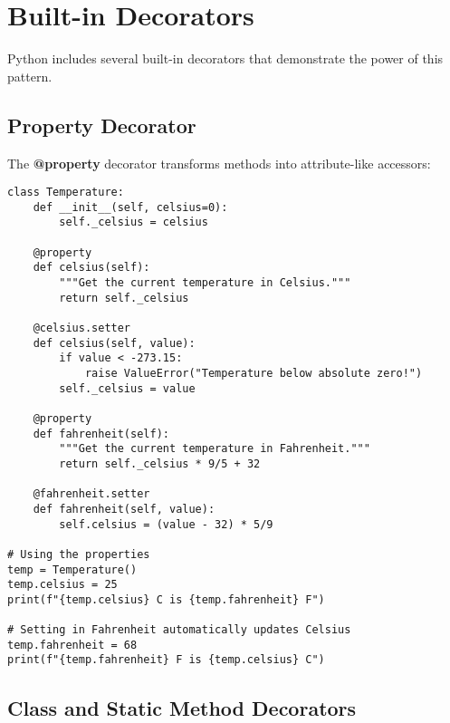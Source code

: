 \documentclass[12pt,letterpaper]{article}
\newenvironment{macterminal}{%
    \begin{mdframed}[
        linecolor=terminalFrame,
        backgroundcolor=terminalBg,
        roundcorner=5pt,
        skipabove=10pt,
        skipbelow=10pt,
        linewidth=1pt,
        innertopmargin=10pt, %
        frametitle={%
            \tikz[baseline=(current bounding box.east), outer sep=0pt]{
                \fill[red!80!black] (0,0) circle (5pt);
                \fill[yellow!80!black] (0.7,0) circle (5pt);
                \fill[green!70!black] (1.4,0) circle (5pt);
            }
        },
        frametitlealignment=\raggedright, %
        frametitleaboveskip=8pt, %
        frametitlebelowskip=0pt, %
    ]
}{%
    \end{mdframed}%
}
\begin{document}
\section{Built-in Decorators}

Python includes several built-in decorators that demonstrate the power of this pattern.

\subsection{Property Decorator}

The \textbf{\textcolor{accentColor}{@property}} decorator transforms methods into attribute-like accessors:

\begin{macterminal}
\begin{lstlisting}
class Temperature:
    def __init__(self, celsius=0):
        self._celsius = celsius
        
    @property
    def celsius(self):
        """Get the current temperature in Celsius."""
        return self._celsius
        
    @celsius.setter
    def celsius(self, value):
        if value < -273.15:
            raise ValueError("Temperature below absolute zero!")
        self._celsius = value
        
    @property
    def fahrenheit(self):
        """Get the current temperature in Fahrenheit."""
        return self._celsius * 9/5 + 32
        
    @fahrenheit.setter
    def fahrenheit(self, value):
        self.celsius = (value - 32) * 5/9

# Using the properties
temp = Temperature()
temp.celsius = 25
print(f"{temp.celsius} C is {temp.fahrenheit} F")

# Setting in Fahrenheit automatically updates Celsius
temp.fahrenheit = 68
print(f"{temp.fahrenheit} F is {temp.celsius} C")
\end{lstlisting}
\end{macterminal}

\subsection{Class and Static Method Decorators}
\end{document}
